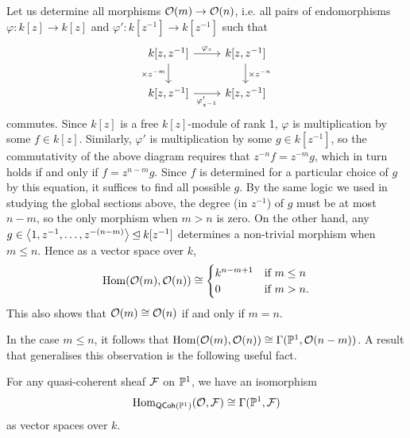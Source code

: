 \begin{example}
  \label{exmp_morphisms_of_twists}
  Let us determine all morphisms $\mathcal{O}({m}) \to \mathcal{O}({n})$, i.e. all
  pairs of endomorphisms $\varphi: k[z] \to k[z]$ and $\varphi':
  k[z^{-1}] \to k[z^{-1}]$ such that
  \[
    \begin{tikzcd}
      {k[z, z^{-1}]} & {k[z, z^{-1}]} \\
      {k[z, z^{-1}]} & {k[z, z^{-1}]}
      \arrow["{\varphi_z}", from=1-1, to=1-2]
      \arrow["\times z^{-m}"', from=1-1, to=2-1]
      \arrow["\times z^{-n}", from=1-2, to=2-2]
      \arrow["{\varphi'_{z^{-1}}}"', from=2-1, to=2-2]
    \end{tikzcd}
  \]
  commutes.
  Since $k[z]$ is a free $k[z]$-module of rank 1, $\varphi$ is
  multiplication by some $f \in k[z]$.
  Similarly, $\varphi'$ is multiplication by some $g \in k[z^{-1}]$,
  so the commutativity of the above diagram requires that $z^{-n} f =
  z^{-m} g$, which in turn holds if and only if $f = z^{n - m} g$.
  Since $f$ is determined for a particular choice of $g$ by this
  equation, it suffices to find all possible $g$.
  By the same logic we used in studying the global sections above,
  the degree (in $z^{-1}$) of $g$ must be at most $n - m$, so the
  only morphism when $m > n$ is zero.
  On the other hand, any $g \in \left\langle {1, z^{-1}, \ldots, z^{-(n - m)}} \right\rangle
  \unlhd k[z^{-1}]$ determines a non-trivial morphism when $m \leq n$.
  Hence as a vector space over $k$,
  \[
    \operatorname{Hom}(\mathcal{O}({m}), \mathcal{O}({n}))
    \cong
    \begin{cases}
      k^{n - m + 1} & \text{if } m \leq n \\
      0             & \text{if } m > n.
    \end{cases}
  \]
  This also shows that $\mathcal{O}({m}) \cong \mathcal{O}({n})$ if and only if $m = n$.
\end{example}

In the case $m \leq n$, it follows that $\operatorname{Hom}(\mathcal{O}({m}), \mathcal{O}({n}))
\cong \Gamma({\mathbb{P}^{{1}}}, {\mathcal{O}({n - m})})$.
A result that generalises this observation is the following useful fact.

\begin{lemma}
  \label{prop_glob_sect_hom}
  For any quasi-coherent sheaf $\mathcal{F}$ on $\mathbb{P}^{{1}}$, we have an isomorphism
  \[
    \operatorname{Hom}_{\operatorname{\mathsf{QCoh}}(\mathbb{P}^{{1}})}(\mathcal{O}, \mathcal{F}) \cong \Gamma({\mathbb{P}^{{1}}}, {\mathcal{F}})
  \]
  as vector spaces over $k$.
\end{lemma}


